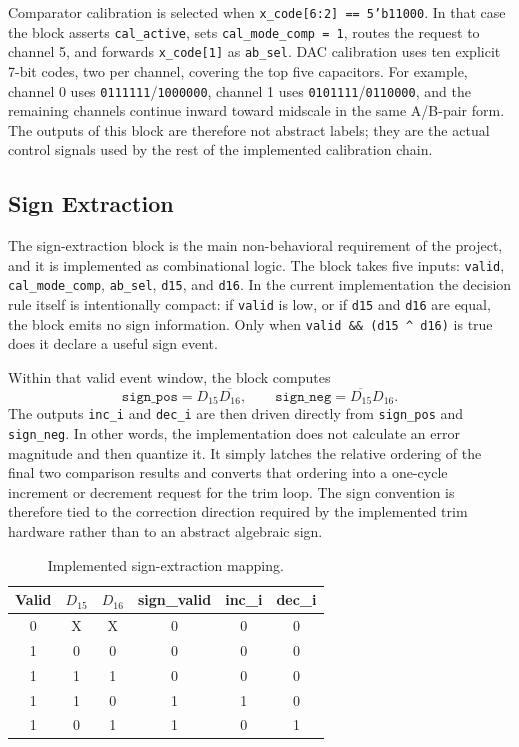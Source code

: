 \documentclass[11pt]{article}
\begin{document}
Comparator calibration is selected when \texttt{x\_code[6:2] == 5'b11000}. In that case the block asserts \texttt{cal\_active}, sets \texttt{cal\_mode\_comp = 1}, routes the request to channel 5, and forwards \texttt{x\_code[1]} as \texttt{ab\_sel}. DAC calibration uses ten explicit 7-bit codes, two per channel, covering the top five capacitors. For example, channel 0 uses \texttt{0111111}/\texttt{1000000}, channel 1 uses \texttt{0101111}/\texttt{0110000}, and the remaining channels continue inward toward midscale in the same A/B-pair form. The outputs of this block are therefore not abstract labels; they are the actual control signals used by the rest of the implemented calibration chain.

\subsection{Sign Extraction}
The sign-extraction block is the main non-behavioral requirement of the project, and it is implemented as combinational logic. The block takes five inputs: \texttt{valid}, \texttt{cal\_mode\_comp}, \texttt{ab\_sel}, \texttt{d15}, and \texttt{d16}. In the current implementation the decision rule itself is intentionally compact: if \texttt{valid} is low, or if \texttt{d15} and \texttt{d16} are equal, the block emits no sign information. Only when \texttt{valid \&\& (d15 \string^ d16)} is true does it declare a useful sign event.

Within that valid event window, the block computes
\[
\texttt{sign\_pos} = D_{15}\overline{D_{16}}, \qquad
\texttt{sign\_neg} = \overline{D_{15}}D_{16}.
\]
The outputs \texttt{inc\_i} and \texttt{dec\_i} are then driven directly from \texttt{sign\_pos} and \texttt{sign\_neg}. In other words, the implementation does not calculate an error magnitude and then quantize it. It simply latches the relative ordering of the final two comparison results and converts that ordering into a one-cycle increment or decrement request for the trim loop. The sign convention is therefore tied to the correction direction required by the implemented trim hardware rather than to an abstract algebraic sign.

\begin{table}[H]
\centering
\caption{Implemented sign-extraction mapping.}
\label{tab:signmap}
\begin{tabular}{cccccc}
\toprule
Valid & $D_{15}$ & $D_{16}$ & sign\_valid & inc\_i & dec\_i \\
\midrule
0 & X & X & 0 & 0 & 0 \\
1 & 0 & 0 & 0 & 0 & 0 \\
1 & 1 & 1 & 0 & 0 & 0 \\
1 & 1 & 0 & 1 & 1 & 0 \\
1 & 0 & 1 & 1 & 0 & 1 \\
\bottomrule
\end{tabular}
\end{table}
\end{document}
